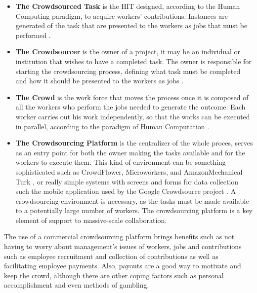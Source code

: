 \begin{itemize}

\item{\textbf{The Crowdsourced Task}} is the HIT designed, according to the Human Computing paradigm, to acquire workers' contributions. Instances are generated of the task that are presented to the workers as jobs that must be performed \cite{Difallah:2015:DMC:2736277.2741685}.

\item{\textbf{The Crowdsourcer}} is the owner of a project, it may be an individual or institution that wishes to have a completed task. The owner is responsible for starting the crowdsourcing process, defining what task must be completed and how it should be presented to the workers as jobs \cite{6861072}.

\item{\textbf{The Crowd}} is the work force that moves the process once it is composed of all the workers who perform the jobs needed to generate the outcome. Each worker carries out his work independently, so that the works can be executed in parallel, according to the paradigm of Human Computation \cite{Rohwer:2010:NHC:1837885.1837897}.

\item{\textbf{The Crowdsourcing Platform}} is the centralizer of the whole proces, serves as an entry point for both the owner making the tasks available and for the workers to execute them. This kind of environment can be something sophisticated such as CrowdFlower, Microworkers, and AmazonMechanical Turk \cite{Difallah:2015:DMC:2736277.2741685}, or really simple systems with screens and forms for data collection such the mobile application used by the Google Crowdsource project \cite{google_cs}. A crowdsourcing environment is necessary, as the tasks must be made available to a potentially large number of workers. The crowdsourcing platform is a key element of support to massive-scale collaboration.

\end{itemize}

The use of a commercial crowdsourcing platform brings benefits such as not having to worry about management's issues of workers, jobs and contributions such as employee recruitment and collection of contributions as well as facilitating employee payments. Also, payouts are a good way to motivate and keep the crowd, although there are other coping factors such as personal accomplishment and even methods of gambling.


